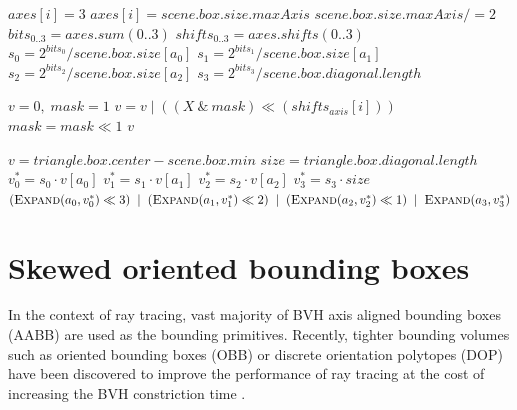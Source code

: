 \begin{algorithm}[h!tb]
\caption{Pseudocode of the 64-bit EMC variant 2 generation. \cite{Vinkler2017}}
\label{alg:emc64var2}
\begin{algorithmic}[1]

      \State $axes[i] = 3$ 
    \Else
      \State $axes[i] = scene.box.size.maxAxis$ 
      \State $scene.box.size.maxAxis /= 2$ 
    \EndIf
  \EndFor
  \State $bits_{0..3} = axes.sum(0..3)$ 
  \State $shifts_{0..3} = axes.shifts(0..3)$ 
  \State $s_0 = 2^{bits_0} / scene.box.size[a_0]$
  \State $s_1 = 2^{bits_1} / scene.box.size[a_1]$
  \State $s_2 = 2^{bits_2} / scene.box.size[a_2]$
  \State $s_3 = 2^{bits_3} / scene.box.diagonal.length$
\EndFunction

  \State $v = 0,\; mask = 1$
    \State $v = v \mid ((X\ \&\ mask) \ll (shifts_{axis}[i]))$
    \State $mask = mask \ll 1$
  \EndFor
  \State \Return $v$
\EndFunction

  \State $v = triangle.box.center - scene.box.min$
  \State $size = triangle.box.diagonal.length$
  \State $v^*_0 = s_0 \cdot v[a_0]$
  \State $v^*_1 = s_1 \cdot v[a_1]$
  \State $v^*_2 = s_2 \cdot v[a_2]$
  \State $v^*_3 = s_3 \cdot size$
  \State \Return
    $(\Call{Expand}{a_0, v^*_0}  \ll 3) \;\mid\;
      (\Call{Expand}{a_1, v^*_1} \ll 2) \;\mid\;
      (\Call{Expand}{a_2, v^*_2} \ll 1) \;\mid\;
      \Call{Expand}{a_3, v^*_3}$
\EndFunction
  
\end{algorithmic}
\end{algorithm}


\clearpage
\section{Skewed oriented bounding boxes}
\label{sec:sobb}

In the context of ray tracing, vast majority of BVH axis aligned bounding boxes (AABB) are used as the bounding primitives. Recently, tighter bounding volumes such as oriented bounding boxes (OBB) \cite{OR85} or discrete orientation polytopes (DOP) \cite{KZ97} have been discovered to improve the performance of ray tracing at the cost of increasing the BVH constriction time \cite{KB24}.


